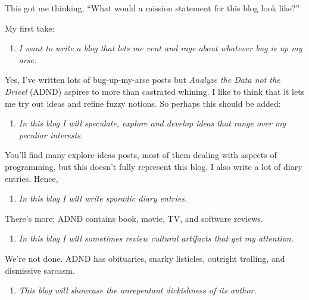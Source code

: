 This got me thinking, ``What would a mission statement for this blog
look like?''

My first take:

\begin{enumerate}
\def\labelenumi{\arabic{enumi}.}
\tightlist
\item
  \emph{I want to write a blog that lets me vent and rage about whatever
  bug is up my arse.}
\end{enumerate}

Yes, I've written lots of bug-up-my-arse posts but \emph{Analyze the
Data not the Drivel} (ADND) aspires to more than castrated whining. I
like to think that it lets me try out ideas and refine fuzzy notions. So
perhaps this should be added:

\begin{enumerate}
\def\labelenumi{\arabic{enumi}.}
\setcounter{enumi}{1}
\tightlist
\item
  \emph{In this blog I will speculate, explore and develop ideas that
  range over my peculiar interests.}
\end{enumerate}

You'll find many explore-ideas posts, most of them dealing with aspects
of programming, but this doesn't fully represent this blog. I also write
a lot of diary entries. Hence,

\begin{enumerate}
\def\labelenumi{\arabic{enumi}.}
\setcounter{enumi}{2}
\tightlist
\item
  \emph{In this blog I will write sporadic diary entries.}
\end{enumerate}

There's more; ADND contains book, movie, TV, and software reviews.

\begin{enumerate}
\def\labelenumi{\arabic{enumi}.}
\setcounter{enumi}{3}
\tightlist
\item
  \emph{In this blog I will sometimes review cultural artifacts that get
  my attention.}
\end{enumerate}

We're not done. ADND has obituaries, snarky listicles, outright
trolling, and dismissive sarcasm.

\begin{enumerate}
\def\labelenumi{\arabic{enumi}.}
\setcounter{enumi}{4}
\tightlist
\item
  \emph{This blog will showcase the unrepentant dickishness of its
  author.}
\end{enumerate}

